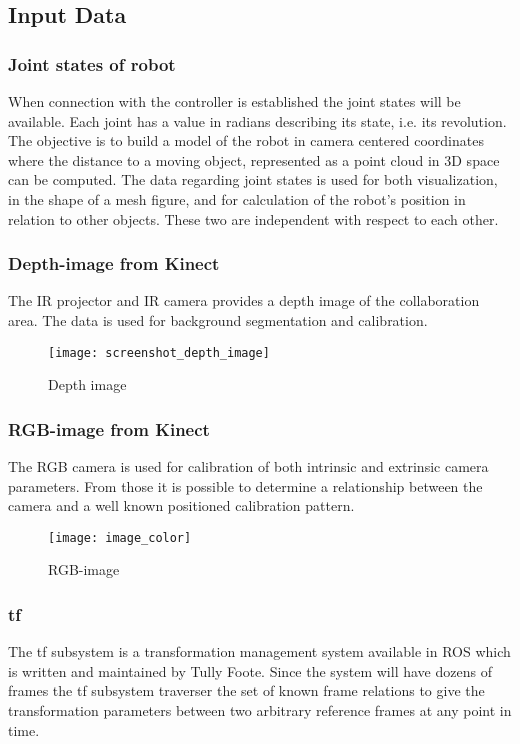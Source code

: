 \subsection{Input Data}
\subsubsection{Joint states of robot}
When connection with the controller is established the joint states will be available. Each joint has a value in radians describing its state, i.e. its revolution. The objective is to build a model of the robot in camera centered coordinates where the distance to a moving object, represented as a point cloud in 3D space can be computed.
The data regarding joint states is used for both visualization, in the shape of a mesh figure, and for calculation of the robot's position in relation to other objects. These two are independent with respect to each other.

\subsubsection{Depth-image from Kinect}
The IR projector and IR camera provides a depth image of the collaboration area. The data is used for background segmentation and calibration. 

\begin{figure}[H]
\begin{center}
\texttt{[image: screenshot\_depth\_image]}
\caption{Depth image}

\end{center}
\end{figure}

\subsubsection{RGB-image from Kinect}
The RGB camera is used for calibration of both intrinsic and extrinsic camera parameters. From those it is possible to determine a relationship between the camera and a well known positioned calibration pattern. 

\begin{figure}[H]
\begin{center}
\texttt{[image: image\_color]}
\caption{RGB-image}

\end{center}
\end{figure}

\subsubsection{tf}
The tf subsystem is a transformation management system available in ROS which is written and maintained by Tully Foote. Since the system will have dozens of frames the tf subsystem traverser the set of known frame relations to give the transformation parameters between two arbitrary reference frames at any point in time. 